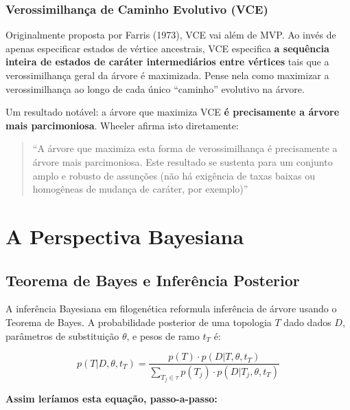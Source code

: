 \subsubsection{Verossimilhança de Caminho Evolutivo (VCE)}

Originalmente proposta por Farris (1973), VCE vai além de MVP. Ao invés de apenas especificar estados de vértice ancestrais, VCE especifica \textbf{a sequência inteira de estados de caráter intermediários entre vértices} tais que a verossimilhança geral da árvore é maximizada. Pense nela como maximizar a verossimilhança ao longo de cada único ``caminho'' evolutivo na árvore.

Um resultado notável: a árvore que maximiza VCE \textbf{é precisamente a árvore mais parcimoniosa}. Wheeler afirma isto diretamente:

\begin{quote}
``A árvore que maximiza esta forma de verossimilhança é precisamente a árvore mais parcimoniosa. Este resultado se sustenta para um conjunto amplo e robusto de assunções (não há exigência de taxas baixas ou homogêneas de mudança de caráter, por exemplo)'' \parencite{wheeler2012}
\end{quote}

\section{A Perspectiva Bayesiana}

\subsection{Teorema de Bayes e Inferência Posterior}

A inferência Bayesiana em filogenética reformula inferência de árvore usando o Teorema de Bayes. A probabilidade posterior de uma topologia $T$ dado dados $D$, parâmetros de substituição $\theta$, e pesos de ramo $t_T$ é:

$$p(T|D, \theta, t_T) = \frac{p(T) \cdot p(D|T, \theta, t_T)}{\sum_{T_j \in \tau} p(T_j) \cdot p(D|T_j, \theta, t_T)}$$

\textbf{Assim leríamos esta equação, passo-a-passo:}

